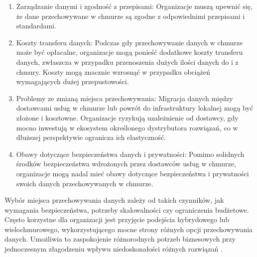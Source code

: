 \documentclass[12pt,a4paper,twoside]{article}
\begin{document}
\begin{itemize}
\begin{enumerate}
			\item Zarządzanie danymi i zgodność z przepisami: Organizacje muszą upewnić się, że dane przechowywane w chmurze są zgodne z odpowiednimi przepisami i standardami.
			\item Koszty transferu danych: Podczas gdy przechowywanie danych w chmurze może być opłacalne, organizacje mogą ponieść dodatkowe koszty transferu danych, zwłaszcza w przypadku przenoszenia dużych ilości danych do i z chmury. Koszty mogą znacznie wzrosnąć w przypadku obciążeń wymagających dużej przepustowości.
			\item Problemy ze zmianą miejsca przechowywania: Migracja danych między dostawcami usług w chmurze lub powrót do infrastruktury lokalnej mogą być złożone i kosztowne. Organizacje ryzykują uzależnienie od dostawcy, gdy mocno inwestują w ekosystem określonego dystrybutora rozwiązań, co w dłuższej perspektywie ogranicza ich elastyczność.
			\item Obawy dotyczące bezpieczeństwa danych i prywatności: Pomimo solidnych środków bezpieczeństwa wdrożonych przez dostawców usług w chmurze, organizacje mogą nadal mieć obawy dotyczące bezpieczeństwa i prywatności swoich danych przechowywanych w chmurze.
		\end{enumerate}
\end{itemize}\par
Wybór miejsca przechowywania danych zależy od takich czynników, jak wymagania bezpieczeństwa, potrzeby skalowalności czy ograniczenia budżetowe. Często korzystne dla organizacji jest przyjęcie podejścia hybrydowego lub wielochmurowego, wykorzystującego mocne strony różnych opcji przechowywania danych. Umożliwia to zaspokojenie różnorodnych potrzeb biznesowych przy jednoczesnym złagodzeniu wpływu niedoskonałości różnych rozwiązań \cite{Ho2022}.
\end{document}
